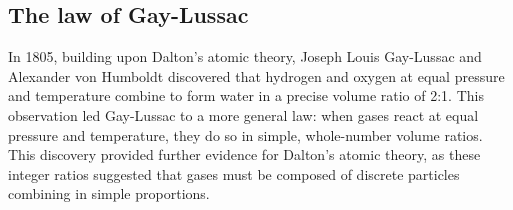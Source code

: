 \documentclass[
  a4paper,
]{book}
\begin{document}
\subsection{The law of Gay-Lussac}\label{the-law-of-gay-lussac}

In 1805, building upon Dalton's atomic theory, Joseph Louis Gay-Lussac
and Alexander von Humboldt discovered that hydrogen and oxygen at equal
pressure and temperature combine to form water in a precise volume ratio
of 2:1. This observation led Gay-Lussac to a more general law: when
gases react at equal pressure and temperature, they do so in simple,
whole-number volume ratios. This discovery provided further evidence for
Dalton's atomic theory, as these integer ratios suggested that gases
must be composed of discrete particles combining in simple proportions.
\end{document}
